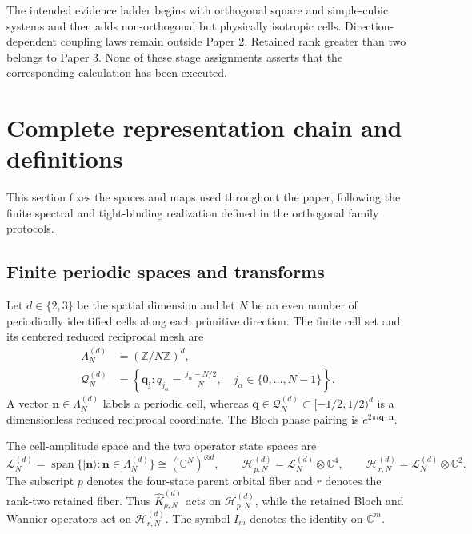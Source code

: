 \documentclass[11pt]{article}
\newenvironment{prospective}{\color{prospectivered}}{}
\newcommand{\C}{\mathbb C}
\begin{document}
\begin{prospective}
The intended evidence ladder begins with orthogonal square and simple-cubic systems and
then adds non-orthogonal but physically isotropic cells. Direction-dependent coupling
laws remain outside Paper 2. Retained rank greater than two belongs to Paper 3. None of
these stage assignments asserts that the corresponding calculation has been executed.
\end{prospective}

\section{Complete representation chain and definitions}

This section fixes the spaces and maps used throughout the paper, following the finite
spectral and tight-binding realization defined in the orthogonal family protocols.

\subsection{Finite periodic spaces and transforms}

Let $d\in\{2,3\}$ be the spatial dimension and let $N$ be an even number of periodically
identified cells along each primitive direction. The finite cell set and its centered
reduced reciprocal mesh are
\begin{align}
 \Lambda_N^{(d)}&=(\mathbb Z/N\mathbb Z)^d,\\
 \mathcal Q_N^{(d)}
 &=\left\{\mathbf q_{\mathbf j}:q_{j_\alpha}
   =\frac{j_\alpha-N/2}{N},\quad
   j_\alpha\in\{0,\ldots,N-1\}\right\}.
 \label{eq:finite-cell-and-mesh}
\end{align}
A vector $\mathbf n\in\Lambda_N^{(d)}$ labels a periodic cell, whereas
$\mathbf q\in\mathcal Q_N^{(d)}\subset[-1/2,1/2)^d$ is a dimensionless reduced
reciprocal coordinate. The Bloch phase pairing is
$e^{2\pi i\mathbf q\cdot\mathbf n}$.

The cell-amplitude space and the two operator state spaces are
\begin{equation}
 \mathcal L_N^{(d)}
 =\operatorname{span}\{\lvert\mathbf n\rangle:\mathbf n\in\Lambda_N^{(d)}\}
 \cong(\C^N)^{\otimes d},\qquad
 \mathcal H_{p,N}^{(d)}=\mathcal L_N^{(d)}\otimes\C^4,
 \qquad
 \mathcal H_{r,N}^{(d)}=\mathcal L_N^{(d)}\otimes\C^2.
 \label{eq:spaces}
\end{equation}
The subscript $p$ denotes the four-state parent orbital fiber and $r$ denotes the
rank-two retained fiber. Thus $\widehat K_{\rho,N}^{(d)}$ acts on
$\mathcal H_{p,N}^{(d)}$, while the retained Bloch and Wannier operators act on
$\mathcal H_{r,N}^{(d)}$. The symbol $I_m$ denotes the identity on $\C^m$.
\end{document}
